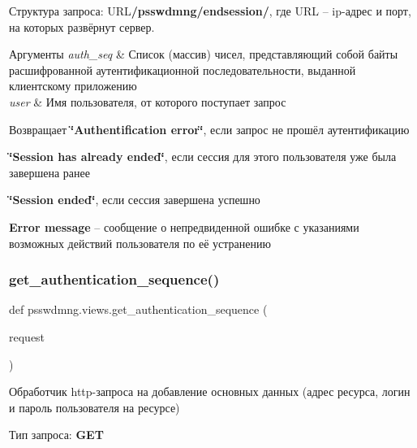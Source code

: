 Структура запроса\+: {\ttfamily U\+RL{\bfseries /psswdmng/endsession/}}, где {\ttfamily U\+RL} – ip-\/адрес и порт, на которых развёрнут сервер. 
\begin{DoxyParams}{Аргументы}
{\em auth\+\_\+seq} & Список (массив) чисел, представляющий собой байты расшифрованной аутентификационной последовательности, выданной клиентскому приложению \\
\hline
{\em user} & Имя пользователя, от которого поступает запрос \\
\hline
\end{DoxyParams}
\begin{DoxyReturn}{Возвращает}
{\bfseries \char`\"{}\+Authentification error\char`\"{}}, если запрос не прошёл аутентификацию 

{\bfseries \char`\"{}\+Session has already ended\char`\"{}}, если сессия для этого пользователя уже была завершена ранее 

{\bfseries \char`\"{}\+Session ended\char`\"{}}, если сессия завершена успешно 

{\bfseries Error message} – сообщение о непредвиденной ошибке с указаниями возможных действий пользователя по её устранению 
\end{DoxyReturn}
\mbox{\label{namespacepsswdmng_1_1views_a38563d05f60414abbf1e16b4b3a2e4a7}} 
\subsubsection{get\+\_\+authentication\+\_\+sequence()}
{\footnotesize\ttfamily def psswdmng.\+views.\+get\+\_\+authentication\+\_\+sequence (\begin{DoxyParamCaption}\item[{}]{request }\end{DoxyParamCaption})}



Обработчик http-\/запроса на добавление основных данных (адрес ресурса, логин и пароль пользователя на ресурсе) 

Тип запроса\+: {\bfseries G\+ET} 


